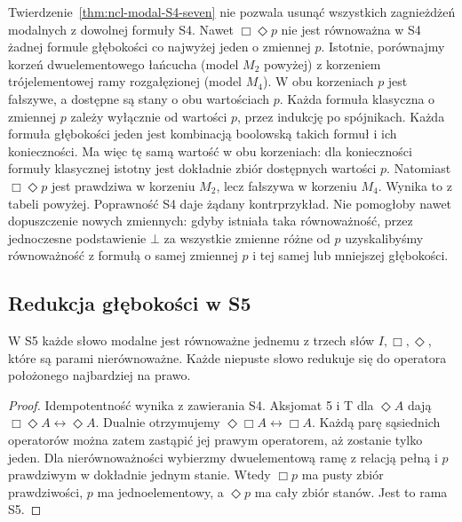 \begin{uwaga}
\label{rem:ncl-modal-S4-depth}
Twierdzenie~\ref{thm:ncl-modal-S4-seven} nie
pozwala usunąć wszystkich zagnieżdżeń modalnych
z dowolnej formuły S4. Nawet $\Box\Diamond p$
nie jest równoważna w S4 żadnej formule
głębokości co najwyżej jeden o zmiennej $p$.
Istotnie, porównajmy korzeń dwuelementowego
łańcucha (model $M_2$ powyżej) z korzeniem
trójelementowej ramy rozgałęzionej (model $M_4$).
W obu korzeniach $p$ jest fałszywe, a dostępne
są stany o obu wartościach $p$.
Każda formuła klasyczna o zmiennej $p$ zależy
wyłącznie od wartości $p$, przez indukcję
po spójnikach. Każda formuła głębokości jeden
jest kombinacją boolowską takich formuł i ich
konieczności. Ma więc tę samą wartość w obu
korzeniach: dla konieczności formuły klasycznej
istotny jest dokładnie zbiór dostępnych wartości $p$.
Natomiast $\Box\Diamond p$ jest prawdziwa
w korzeniu $M_2$, lecz fałszywa w korzeniu $M_4$.
Wynika to z tabeli powyżej. Poprawność S4
daje żądany kontrprzykład.
Nie pomogłoby nawet dopuszczenie nowych zmiennych:
gdyby istniała taka równoważność, przez
jednoczesne podstawienie $\bot$ za wszystkie
zmienne różne od $p$ uzyskalibyśmy równoważność
z formułą o samej zmiennej $p$ i tej samej
lub mniejszej głębokości.
\end{uwaga}

\subsection{Redukcja głębokości w S5}

\begin{stwierdzenie}
\label{prop:ncl-modal-S5-three}
W S5 każde słowo modalne jest równoważne
jednemu z trzech słów $I,\Box,\Diamond$,
które są parami nierównoważne.
Każde niepuste słowo redukuje się do
operatora położonego najbardziej na prawo.
\end{stwierdzenie}
\begin{proof}
Idempotentność wynika z zawierania S4.
Aksjomat 5 i T dla $\Diamond A$ dają
$\Box\Diamond A\leftrightarrow\Diamond A$.
Dualnie otrzymujemy
$\Diamond\Box A\leftrightarrow\Box A$.
Każdą parę sąsiednich operatorów można zatem
zastąpić jej prawym operatorem, aż zostanie
tylko jeden. Dla nierównoważności wybierzmy
dwuelementową ramę z relacją pełną i $p$
prawdziwym w dokładnie jednym stanie.
Wtedy $\Box p$ ma pusty zbiór prawdziwości,
$p$ ma jednoelementowy, a $\Diamond p$
ma cały zbiór stanów. Jest to rama S5.
\end{proof}

